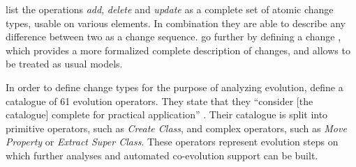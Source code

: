 \textcite{khelladi_detecting_2015} list the operations \emph{add}, \emph{delete} and \emph{update} as a complete set of atomic change types, usable on various \metamodel elements.
In combination they are able to describe any difference between two \metamodels as a change sequence.
\textcite{burger_change_2010} go further by defining a change \metamodel, which provides a more formalized complete description of \metamodel changes, and allows \metamodels to be treated as usual models.

In order to define change types for the purpose of analyzing \metamodel evolution, \textcite{herrmannsdoerfer_extensive_2011} define a catalogue of 61 \metamodel evolution operators.
They state that they ``consider [the catalogue] complete for practical application'' \cite{herrmannsdoerfer_extensive_2011}.
Their catalogue is split into primitive operators, such as \emph{Create Class}, and complex operators, such as \emph{Move Property} or \emph{Extract Super Class}.
These operators represent evolution steps on which further analyses and automated co-evolution support can be built.
